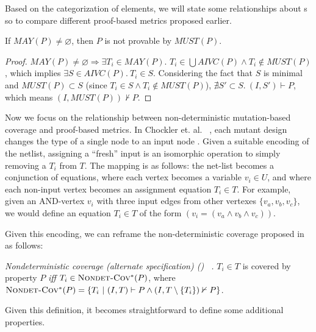 Based on the categorization of elements, we will state some relationships about \mivc s so to compare different proof-based metrics proposed earlier.

\begin{lemma}
  \label{lem:must-not-enough}
  If $MAY(P) \neq \varnothing$, then $P$ is not provable by $MUST(P)$.
\end{lemma}
\begin{proof}
  $MAY(P) \neq \varnothing \Rightarrow  \exists T_i \in MAY(P).$
$T_i \in \bigcup AIVC(P) \wedge T_i \notin MUST(P)$,
which implies $\exists S \in AIVC(P).~ T_i \in S$.
Considering the fact that $S$ is minimal and
$MUST(P) \subset S$ (since $T_i \in S \wedge T_i \notin MUST(P)$),
 $\nexists S' \subset S.~ (I,S') \vdash P$,  which means $(I, MUST(P)) \nvdash P$.
\end{proof}
\vspace{2mm}


Now we focus on the relationship between non-deterministic mutation-based coverage and proof-based metrics. In Chockler et. al.
~\cite{chockler2010coverage},
each mutant design changes the type of a single node to an input node .
Given a suitable encoding of the netlist, assigning a ``fresh'' input is an isomorphic operation to simply removing a $T_i$ from $T$. The mapping is as follows: the net-list becomes a conjunction
of equations, where each vertex becomes a variable $v_i \in U$, and where each non-input vertex becomes an assignment equation $T_i \in T$.
For example, given an AND-vertex $v_i$ with three input edges from other vertexes $\{v_a, v_b, v_c\}$, we would define an equation $T_i \in T$ of the form $(v_i = (v_a \wedge v_b \wedge v_c))$.
%

Given this encoding, we can reframe the non-deterministic coverage proposed in \cite{chockler2010coverage} as follows:

\begin{definition} {\emph{Nondeterministic coverage (alternate specification) (\nondetcovalt) ~\cite{chockler2010coverage}.} }
\label{def:non-det-2}
$T_i \in T$ is covered by property $P$ \emph{iff} $T_i \in \text{\sc Nondet-Cov$^{*}$} (P)$, where
$\text{\sc Nondet-Cov$^{*}$} (P) = \{T_i~|~ (I, T) \vdash P \wedge (I, T \setminus \{T_i\}) \nvdash P\}$.
\end{definition}
\noindent Given this definition, it becomes straightforward to define some additional properties.


